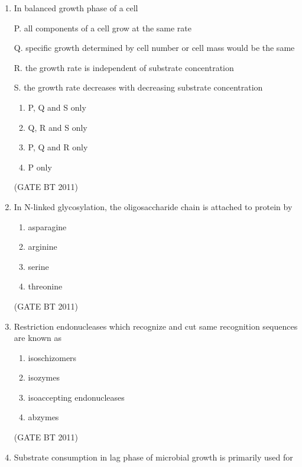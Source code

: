 \documentclass[journal,12pt,onecolumn]{IEEEtran}
\begin{document}
\begin{enumerate}
    \item In balanced growth phase of a cell 

    P. all components of a cell grow at the same rate 
    
    Q. specific growth determined by cell number or cell mass would be the same  
    
    R. the growth rate is independent of substrate concentration  
    
    S. the growth rate decreases with decreasing substrate concentration  

    \begin{multicols}{2}
    \begin{enumerate}
        \item P, Q and S only
        \item Q, R and S only
        \item P, Q and R only
        \item P only
    \end{enumerate}
    \end{multicols} \hfill(GATE BT 2011)

    \item In N-linked glycosylation, the oligosaccharide chain is attached to protein by
    \begin{multicols}{2}
    \begin{enumerate}
        \item asparagine
        \item arginine
        \item serine
        \item threonine
    \end{enumerate}
    \end{multicols} \hfill(GATE BT 2011)

    \item Restriction endonucleases which recognize and cut same recognition sequences are known as
    \begin{multicols}{2}
    \begin{enumerate}
        \item isoschizomers
        \item isozymes
        \item isoaccepting endonucleases
        \item abzymes
    \end{enumerate}
    \end{multicols} \hfill(GATE BT 2011)

    \item Substrate consumption in lag phase of microbial growth is primarily used for  


\end{enumerate}
\end{document}
